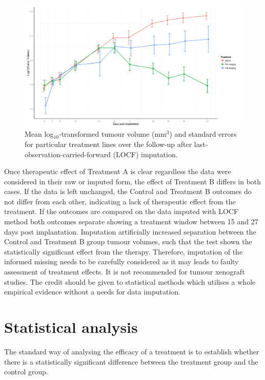 \begin{figure}
	\centering
	\includegraphics[width=\textwidth]{xenograph/figures/error_bars_log_LOCF_reduced_follow-up.png}
	\caption{Mean log$_{10}$-transformed tumour volume (mm$^3$) and standard errors for particular treatment lines over the follow-up after last-observation-carried-forward (LOCF) imputation.}
	\label{error_bars_log_LOCF_reduced_follow-up}
\end{figure}

Once therapeutic effect of Treatment A is clear regardless the data were considered in their raw or imputed form, the effect of Treatment B differs in both cases.
If the data is left unchanged, the Control and Treatment B outcomes do not differ from each other, indicating a lack of therapeutic effect from the treatment.
If the outcomes are compared on the data imputed with LOCF method both outcomes separate showing a treatment window between 15 and 27 days post implantation.
Imputation artificially increased separation between the Control and Treatment B group tumour volumes, such that the test shown the statistically significant effect from the therapy.
Therefore, imputation of the informed missing needs to be carefully considered as it may leads to faulty assessment of treatment effects.
It is not recommended for tumour xenograft studies.
The credit should be given to statistical methods which utilises a whole empirical evidence without a needs for data imputation.

\section{Statistical analysis}

The standard way of analysing the efficacy of a treatment is to establish whether there is a statistically significant difference between the treatment group and the control group.

